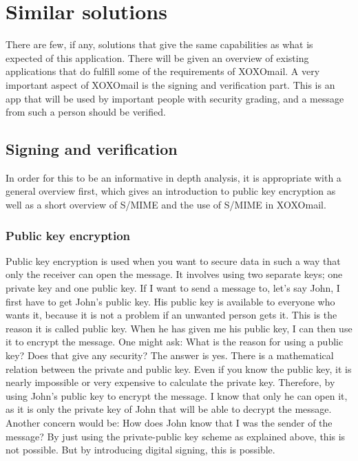 

\section{Similar solutions}
There are few, if any, solutions that give the same capabilities as what is expected of this application. There will be given an overview of existing applications that do fulfill some of the requirements of XOXOmail.
\newline
\newline
A very important aspect of XOXOmail is the signing and verification part. This is an app that will be used by important people with security grading, and a message from such a person should be verified.

\subsection{Signing and verification}
In order for this to be an informative in depth analysis, it is appropriate with a general overview first, which gives an introduction to public key encryption as well as a short overview of S/MIME and the use of S/MIME in XOXOmail.

\subsubsection{Public key encryption}
Public key encryption is used when you want to secure data in such a way that only the receiver can open the message. It involves using two separate keys; one private key and one public key.\cite{bib:pke}
\newline
\newline
If I want to send a message to, let's say John, I first have to get John's public key. His public key is available to everyone who wants it, because it is not a problem if an unwanted person gets it. This is the reason it is called public key. When he has given me his public key, I can then use it to encrypt the message. One might ask: What is the reason for using a
public key? Does that give any security? The answer is yes. There is a mathematical relation between the private and public key. Even if you know the public key, it is nearly impossible or very expensive to calculate the private key. Therefore, by using John's public key to encrypt the message. I know that only he can open it, as it is only the private key of John that will be able to decrypt the message.
\newline
\newline
Another concern would be: How does John know that I was the sender of the message? By just using the private-public key scheme as explained above, this is not possible. But by introducing digital signing, this is possible.


